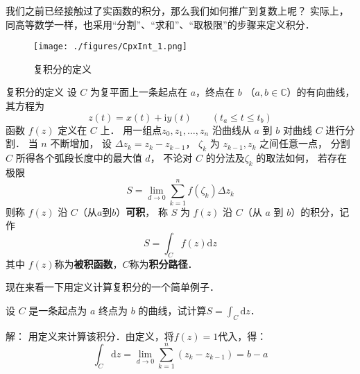 
\begin{issues}
\end{issues}



我们之前已经接触过了实函数的积分，那么我们如何推广到复数上呢？ 实际上，同高等数学一样，也采用“分割”、“求和”、“取极限”的步骤来定义积分．

\begin{figure}[ht]
\centering
\texttt{[image: ./figures/CpxInt\_1.png]}
\caption{复积分的定义} \label{CpxInt_fig1}
\end{figure}

\begin{definition}{复积分的定义}
设 $C$ 为复平面上一条起点在 $a$，终点在 $b$ （$a,b\in\mathbb C$）的有向曲线， 其方程为
\begin{equation}
z(t)=x(t)+\mathrm{i} y(t) \qquad(t_a \leqslant t \leqslant t_b)
\end{equation}
函数 $f(z)$ 定义在 $C$ 上． 用一组点$z_{0}, z_{1}, \dots, z_{n}$ 沿曲线从 $a$ 到 $b$ 对曲线 $C$ 进行分割． 当 $n$ 不断增加， 设 $\Delta z_{k}=z_{k}-z_{k-1}$， $\zeta_k$ 为 $z_{k-1},z_k$ 之间任意一点， 分割 $C$ 所得各个弧段长度中的最大值 $d$， 不论对 $C$ 的分法及$\zeta_k$ 的取法如何， 若存在极限
\begin{equation}
S = \lim_{d \rightarrow 0} \sum_{k=1}^{n} f\left(\zeta_{k}\right) \Delta z_{k}
\end{equation}
则称 $f(z)$ 沿 $C $（从$a$到$b$）\textbf{可积}， 称 $S$ 为 $f(z)$ 沿 $C$（从 $a$ 到 $b$）的积分，记作
\begin{equation}
S=\int_{C} f(z) \mathrm{d} z
\end{equation}
其中 $f (z)$称为\textbf{被积函数}，$C$称为\textbf{积分路径}．
\end{definition}

现在来看一下用定义计算复积分的一个简单例子．
\begin{example}{}
设 $C$ 是一条起点为 $a$ 终点为 $b$ 的曲线，试计算$\displaystyle S=\int_C\mathrm dz$．

解： 用定义来计算该积分．由定义，将$f(z)=1$代入，得：
\begin{equation}
\int_{C} \mathrm{d} z=\lim _{d \rightarrow 0} \sum_{k=1}^{n}\left(z_{k}-z_{k-1}\right)= b-a
\end{equation}
\end{example}

